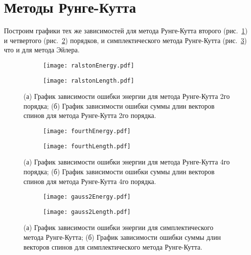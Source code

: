 \section{Методы Рунге-Кутта}
Построим графики тех же зависимостей для метода Рунге-Кутта второго
(рис.~\ref{fig:rk2-errors}) и четвертого (рис.~\ref{fig:rk4-errors}) порядков,
и симплектического метода Рунге-Кутта (рис.~\ref{fig:simp-rk-errors}) что и для
метода Эйлера.
\begin{figure}[H]
    \centering
    \begin{subfigure}[b]{0.49\textwidth}
        \centering
        \texttt{[image: ralstonEnergy.pdf]}
        \caption{}
    \end{subfigure}
    \begin{subfigure}[b]{0.49\textwidth}
        \centering
        \texttt{[image: ralstonLength.pdf]}
        \caption{}
    \end{subfigure}
    \caption{(а) График зависимости ошибки энергии для метода Рунге-Кутта 2го
        порядка;
        (б) График зависимости ошибки суммы длин векторов спинов для
        метода Рунге-Кутта 2го порядка.}
\label{fig:rk2-errors}
\end{figure}
\begin{figure}[H]
    \centering
    \begin{subfigure}[b]{0.49\textwidth}
        \centering
        \texttt{[image: fourthEnergy.pdf]}
        \caption{}
    \end{subfigure}
    \begin{subfigure}[b]{0.49\textwidth}
        \centering
        \texttt{[image: fourthLength.pdf]}
        \caption{}
    \end{subfigure}
    \caption{(а) График зависимости ошибки энергии для метода Рунге-Кутта 4го
        порядка;
        (б) График зависимости ошибки суммы длин векторов спинов для
        метода Рунге-Кутта 4го порядка.}
\label{fig:rk4-errors}
\end{figure}
\begin{figure}[H]
    \centering
    \begin{subfigure}[b]{0.49\textwidth}
        \centering
        \texttt{[image: gauss2Energy.pdf]}
        \caption{}
    \end{subfigure}
    \begin{subfigure}[b]{0.49\textwidth}
        \centering
        \texttt{[image: gauss2Length.pdf]}
        \caption{}
    \end{subfigure}
    \caption{(а) График зависимости ошибки энергии для симплектического
        метода Рунге-Кутта;
        (б) График зависимости ошибки суммы длин векторов спинов для
        симплектического метода Рунге-Кутта.}
\label{fig:simp-rk-errors}
\end{figure}

